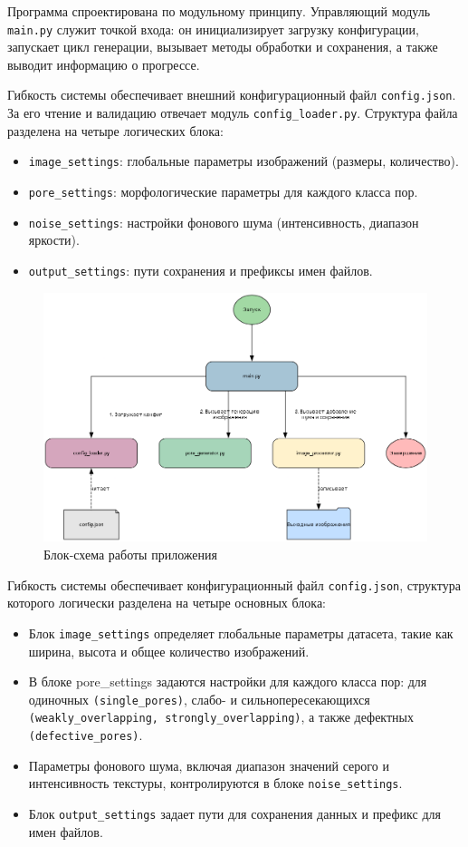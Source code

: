 \documentclass[code]{wordcore}
\begin{document}
Программа спроектирована по модульному принципу. Управляющий модуль \texttt{main.py} служит точкой входа: он инициализирует загрузку конфигурации, запускает цикл генерации, вызывает методы обработки и сохранения, а также выводит информацию о прогрессе.

Гибкость системы обеспечивает внешний конфигурационный файл \texttt{config\-.json}. За его чтение и валидацию отвечает модуль \texttt{config\_loader.py}. Структура файла разделена на четыре логических блока:

\begin{itemize}
	\item \texttt{image\_settings}: глобальные параметры изображений (размеры, количество).
	\item \texttt{pore\_settings}: морфологические параметры для каждого класса пор.
	\item \texttt{noise\_settings}: настройки фонового шума (интенсивность, диапазон яркости).
	\item \texttt{output\_settings}: пути сохранения и префиксы имен файлов.
\end{itemize}

\begin{figure}[H]
	\centering
	\includegraphics[width=1.0\textwidth]{fig/graphviz.png}
	\caption{Блок-схема работы приложения}
\end{figure}

Гибкость системы обеспечивает конфигурационный файл \texttt{config.json}, структура которого логически разделена на четыре основных блока:

\begin{itemize}
	\item Блок \texttt{image\_settings} определяет глобальные параметры датасета, такие как ширина, высота и общее количество изображений.
	\item В блоке pore\_settings задаются настройки для каждого класса пор: для одиночных \texttt{(single\_pores)}, слабо- и сильнопересекающихся \texttt{(weakly\_over\-lapping, strongly\_overlapping)}, а также дефектных \texttt{(defective\_pores)}.
	\item Параметры фонового шума, включая диапазон значений серого и интенсивность текстуры, контролируются в блоке \texttt{noise\_settings}.
	\item Блок \texttt{output\_settings} задает пути для сохранения данных и префикс для имен файлов.
\end{itemize}
\end{document}
